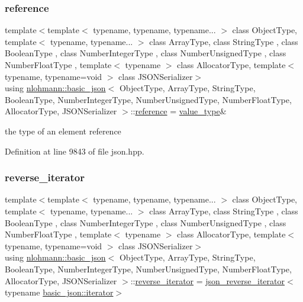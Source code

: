 \subsubsection{\texorpdfstring{reference}{reference}}
{\footnotesize\ttfamily template$<$template$<$ typename, typename, typename... $>$ class Object\+Type, template$<$ typename, typename... $>$ class Array\+Type, class String\+Type , class Boolean\+Type , class Number\+Integer\+Type , class Number\+Unsigned\+Type , class Number\+Float\+Type , template$<$ typename $>$ class Allocator\+Type, template$<$ typename, typename=void $>$ class J\+S\+O\+N\+Serializer$>$ \\
using \hyperlink{classnlohmann_1_1basic__json}{nlohmann\+::basic\+\_\+json}$<$ Object\+Type, Array\+Type, String\+Type, Boolean\+Type, Number\+Integer\+Type, Number\+Unsigned\+Type, Number\+Float\+Type, Allocator\+Type, J\+S\+O\+N\+Serializer $>$\+::\hyperlink{classnlohmann_1_1basic__json_ac6a5eddd156c776ac75ff54cfe54a5bc}{reference} =  \hyperlink{classnlohmann_1_1basic__json_a2b3297873b70c080837e8eedc4fec32f}{value\+\_\+type}\&}



the type of an element reference 



Definition at line 9843 of file json.\+hpp.

\mbox{\label{classnlohmann_1_1basic__json_ac223d5560c2b05a208c88de67376c5f2}} 
\subsubsection{\texorpdfstring{reverse\+\_\+iterator}{reverse\_iterator}}
{\footnotesize\ttfamily template$<$template$<$ typename, typename, typename... $>$ class Object\+Type, template$<$ typename, typename... $>$ class Array\+Type, class String\+Type , class Boolean\+Type , class Number\+Integer\+Type , class Number\+Unsigned\+Type , class Number\+Float\+Type , template$<$ typename $>$ class Allocator\+Type, template$<$ typename, typename=void $>$ class J\+S\+O\+N\+Serializer$>$ \\
using \hyperlink{classnlohmann_1_1basic__json}{nlohmann\+::basic\+\_\+json}$<$ Object\+Type, Array\+Type, String\+Type, Boolean\+Type, Number\+Integer\+Type, Number\+Unsigned\+Type, Number\+Float\+Type, Allocator\+Type, J\+S\+O\+N\+Serializer $>$\+::\hyperlink{classnlohmann_1_1basic__json_ac223d5560c2b05a208c88de67376c5f2}{reverse\+\_\+iterator} =  \hyperlink{classnlohmann_1_1basic__json_a8d18136ac63e52780e9d7441981a2db4}{json\+\_\+reverse\+\_\+iterator}$<$typename \hyperlink{classnlohmann_1_1basic__json_a099316232c76c034030a38faa6e34dca}{basic\+\_\+json\+::iterator}$>$}



